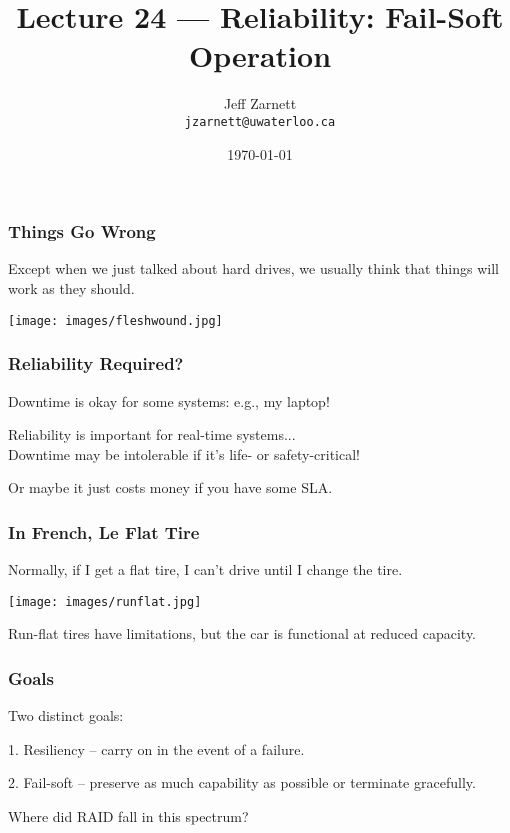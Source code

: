 

\title{Lecture 24 --- Reliability: Fail-Soft Operation }

\author{Jeff Zarnett \\ \small \texttt{jzarnett@uwaterloo.ca}}
\date{\today}




\begin{frame}
  \titlepage

 \end{frame}



\begin{frame}
\frametitle{Things Go Wrong}

Except when we just talked about hard drives, we usually think that things will work as they should.

\begin{center}
	\texttt{[image: images/fleshwound.jpg]}
\end{center}

\end{frame}

\begin{frame}
\frametitle{Reliability Required?}

Downtime is okay for some systems: e.g., my laptop!

Reliability is important for real-time systems...\\
\quad Downtime may be intolerable if it's life- or safety-critical!


Or maybe it just costs money if you have some SLA.

\end{frame}

\begin{frame}
\frametitle{In French, Le Flat Tire}

Normally, if I get a flat tire, I can't drive until I change the tire.

\begin{center}
	\texttt{[image: images/runflat.jpg]}
\end{center}

Run-flat tires have limitations, but the car is functional at reduced capacity.

\end{frame}

\begin{frame}
\frametitle{Goals}

Two distinct goals:

1. Resiliency -- carry on in the event of a failure.

2. Fail-soft -- preserve as much capability as possible or terminate gracefully.

Where did RAID fall in this spectrum?

\end{frame}

